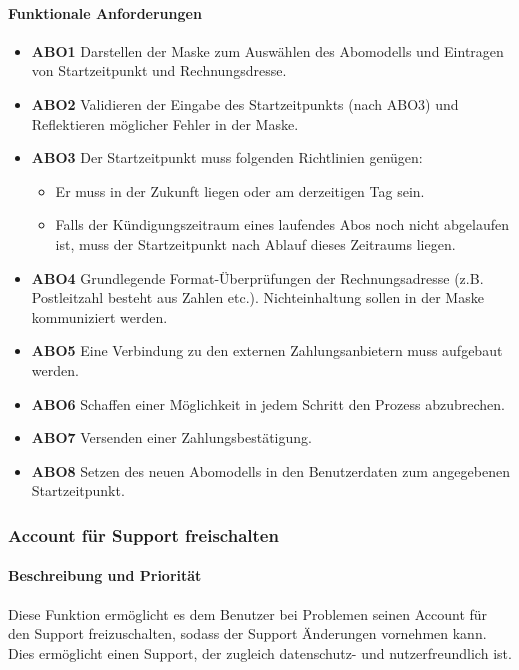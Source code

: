 \paragraph{Funktionale Anforderungen}
\begin{itemize}
	\item \textbf{ABO1} Darstellen der Maske zum Auswählen des Abomodells und Eintragen von Startzeitpunkt
	      und Rechnungsdresse.
	\item \textbf{ABO2} Validieren der Eingabe des Startzeitpunkts (nach ABO3) und Reflektieren möglicher
	      Fehler in der Maske.
	\item \textbf{ABO3} Der Startzeitpunkt muss folgenden Richtlinien genügen:
	      \begin{itemize}
		      \item Er muss in der Zukunft liegen oder am derzeitigen Tag sein.
		      \item Falls der Kündigungszeitraum eines laufendes Abos noch nicht abgelaufen ist,
		            muss der Startzeitpunkt nach Ablauf dieses Zeitraums liegen.
	      \end{itemize}
	\item \textbf{ABO4} Grundlegende Format-Überprüfungen der Rechnungsadresse
	      (z.B. Postleitzahl besteht aus Zahlen etc.).
	      Nichteinhaltung sollen in der Maske kommuniziert werden.
	\item \textbf{ABO5} Eine Verbindung zu den externen Zahlungsanbietern muss aufgebaut werden.
	\item \textbf{ABO6} Schaffen einer Möglichkeit in jedem Schritt den Prozess abzubrechen.
	\item \textbf{ABO7} Versenden einer Zahlungsbestätigung.
	\item \textbf{ABO8} Setzen des neuen Abomodells in den Benutzerdaten zum angegebenen Startzeitpunkt.
\end{itemize}


\subsubsection{Account für Support freischalten}
\label{sys_feat:freischalten}
\paragraph{Beschreibung und Priorität}
Diese Funktion ermöglicht es dem Benutzer bei Problemen seinen Account für den Support freizuschalten,
sodass der Support Änderungen vornehmen kann.
Dies ermöglicht einen Support, der zugleich datenschutz- und nutzerfreundlich ist.
